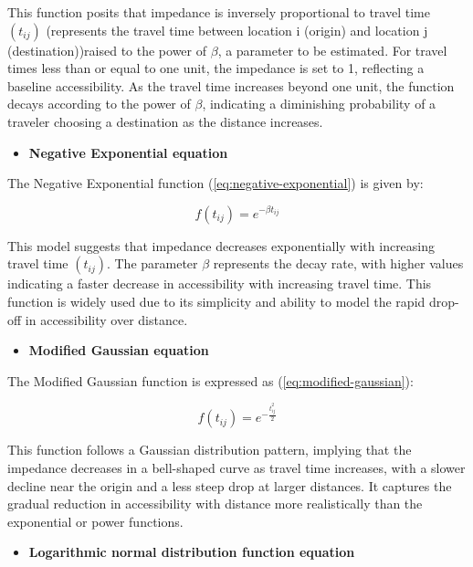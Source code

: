 \documentclass[
11pt, %
oneside, %
english, %
singlespacing, %
]{macthesis} %
\def\tightlist{}
\begin{document}
This function posits that impedance is inversely proportional to travel time \((t_{ij})\) (represents the travel time between location i (origin) and location j (destination))raised to the power of \(\beta\), a parameter to be estimated. For travel times less than or equal to one unit, the impedance is set to 1, reflecting a baseline accessibility. As the travel time increases beyond one unit, the function decays according to the power of \(\beta\), indicating a diminishing probability of a traveler choosing a destination as the distance increases.

\begin{itemize}
\tightlist
\item
  \textbf{Negative Exponential equation}
\end{itemize}

The Negative Exponential function (\eqref{eq:negative-exponential}) is given by:

\begin{equation}
f(t_{ij}) = e^{-\beta t_{ij}}
\label{eq:negative-exponential}
\end{equation}

This model suggests that impedance decreases exponentially with increasing travel time \((t_{ij})\). The parameter \(\beta\) represents the decay rate, with higher values indicating a faster decrease in accessibility with increasing travel time. This function is widely used due to its simplicity and ability to model the rapid drop-off in accessibility over distance.

\begin{itemize}
\tightlist
\item
  \textbf{Modified Gaussian equation}
\end{itemize}

The Modified Gaussian function is expressed as (\eqref{eq:modified-gaussian}):

\begin{equation}
f(t_{ij}) = e^{-\frac{t_{ij}^2}{2}}
\label{eq:modified-gaussian}
\end{equation}

This function follows a Gaussian distribution pattern, implying that the impedance decreases in a bell-shaped curve as travel time increases, with a slower decline near the origin and a less steep drop at larger distances. It captures the gradual reduction in accessibility with distance more realistically than the exponential or power functions.

\begin{itemize}
\tightlist
\item
  \textbf{Logarithmic normal distribution function equation}
\end{itemize}
\end{document}
